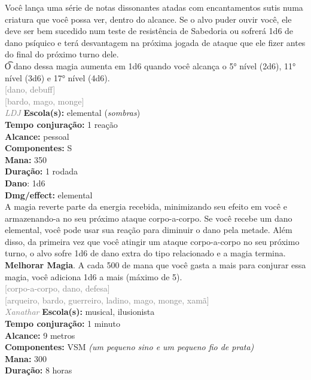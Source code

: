 \documentclass{RPG_Adventure}[2021/10/20]
\begin{document}
{\normalsize Você lança uma série de notas dissonantes atadas com encantamentos sutis numa criatura que você possa ver, dentro do alcance. Se o alvo puder ouvir você, ele deve ser bem sucedido num teste de resistência de Sabedoria ou sofrerá 1d6 de dano psíquico e terá desvantagem na próxima jogada de ataque que ele fizer antes do final do próximo turno dele.\\\t O dano dessa magia aumenta em 1d6 quando você alcança o 5° nível (2d6), 11° nível (3d6) e 17° nível (4d6).\\}
{\scriptsize \textcolor{gray}{[dano, debuff]\\}}
{\scriptsize \textcolor{gray}{[bardo, mago, monge]\\}}
{\tiny \textcolor{gray}{\textit{LDJ}}}
{\small \t \textbf{Escola(s):} elemental (\textit{sombras})\\\t \textbf{Tempo conjuração:} 1 reação\\\t \textbf{Alcance:} pessoal\\\t \textbf{Componentes:} S\\\t \textbf{Mana:} 350\\\t \textbf{Duração:} 1 rodada\\\t \textbf{Dano}: 1d6\\\t \textbf{Dmg/effect:} elemental\\}
{\normalsize A magia reverte parte da energia recebida, minimizando seu efeito em você e armazenando-a no seu próximo ataque corpo-a-corpo. Se você recebe um dano elemental, você pode usar sua reação para diminuir o dano pela metade. Além disso, da primeira vez que você atingir um ataque corpo-a-corpo no seu próximo turno, o alvo sofre 1d6 de dano extra do tipo relacionado e a magia termina.\\\t \textbf{Melhorar Magia}. A cada 500 de mana que você gasta a mais para conjurar essa magia, você adiciona 1d6 a mais (máximo de 5).\\}
{\scriptsize \textcolor{gray}{[corpo-a-corpo, dano, defesa]\\}}
{\scriptsize \textcolor{gray}{[arqueiro, bardo, guerreiro, ladino, mago, monge, xamã]\\}}
{\tiny \textcolor{gray}{\textit{Xanathar}}}
{\small \t \textbf{Escola(s):} musical, ilusionista\\\t \textbf{Tempo conjuração:} 1 minuto\\\t \textbf{Alcance:} 9 metros\\\t \textbf{Componentes:} VSM \textit{(um pequeno sino e um pequeno fio de prata)}\\\t \textbf{Mana:} 300\\\t \textbf{Duração:} 8 horas\\}
\end{document}
